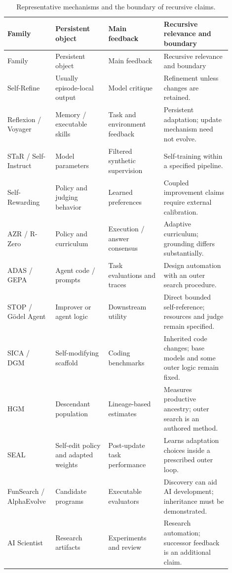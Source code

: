 \documentclass[11pt,american,]{article}
\begin{document}
\begin{longtable}{p{0.16\linewidth}p{0.22\linewidth}p{0.23\linewidth}p{0.29\linewidth}}
\caption{Representative mechanisms and the boundary of recursive claims.}\label{tab:mechanisms}\\
\toprule
Family & Persistent object & Main feedback & Recursive relevance and boundary \\
\midrule\endfirsthead
\toprule Family & Persistent object & Main feedback & Recursive relevance and boundary \\
\midrule\endhead
Self-Refine & Usually episode-local output & Model critique & Refinement unless changes are retained. \\
Reflexion / Voyager & Memory / executable skills & Task and environment feedback & Persistent adaptation; update mechanism need not evolve. \\
STaR / Self-Instruct & Model parameters & Filtered synthetic supervision & Self-training within a specified pipeline. \\
Self-Rewarding & Policy and judging behavior & Learned preferences & Coupled improvement claims require external calibration. \\
AZR / R-Zero & Policy and curriculum & Execution / answer consensus & Adaptive curriculum; grounding differs substantially. \\
ADAS / GEPA & Agent code / prompts & Task evaluations and traces & Design automation with an outer search procedure. \\
STOP / G\"odel Agent & Improver or agent logic & Downstream utility & Direct bounded self-reference; resources and judge remain specified. \\
SICA / DGM & Self-modifying scaffold & Coding benchmarks & Inherited code changes; base models and some outer logic remain fixed. \\
HGM & Descendant population & Lineage-based estimates & Measures productive ancestry; outer search is an authored method. \\
SEAL & Self-edit policy and adapted weights & Post-update task performance & Learns adaptation choices inside a prescribed outer loop. \\
FunSearch / AlphaEvolve & Candidate programs & Executable evaluators & Discovery can aid AI development; inheritance must be demonstrated. \\
AI Scientist & Research artifacts & Experiments and review & Research automation; successor feedback is an additional claim. \\
\bottomrule
\end{longtable}
\end{document}
